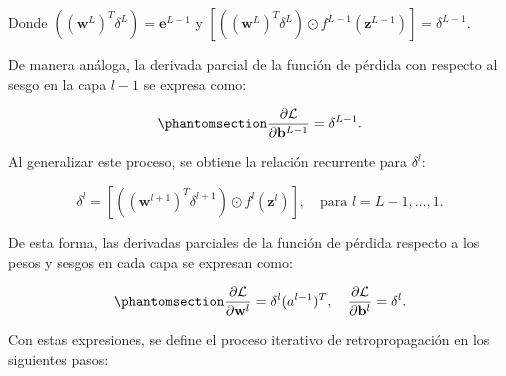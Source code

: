\documentclass[
  us-letterpaper,
]{scrreprt}
\theoremstyle{definition}
\theoremstyle{plain}
\theoremstyle{plain}
\theoremstyle{definition}
\theoremstyle{remark}
\begin{document}
Donde \(((\mathbf w^L)^T \delta^L) = \mathbf e^{L-1}\) y
\([((\mathbf w^L)^T \delta^L)\odot f^{L-1}(\mathbf z^{L-1})] = \delta^{L-1}\).

De manera análoga, la derivada parcial de la función de pérdida con
respecto al sesgo en la capa \(l-1\) se expresa como:

\begin{equation}\phantomsection\label{eq-24}{\frac{\partial \mathcal L}{\partial \mathbf b^{L-1}} = \delta^{L-1}.}\end{equation}

Al generalizar este proceso, se obtiene la relación recurrente para
\(\delta^l\):

\[\delta^l = \left[((\mathbf w^{l+1})^T \delta^{l+1})\odot f^l(\mathbf z^l) \right], \quad \text{para } l = L-1, \ldots, 1.\]

De esta forma, las derivadas parciales de la función de pérdida respecto
a los pesos y sesgos en cada capa se expresan como:

\begin{equation}\phantomsection\label{eq-25}{\frac{\partial \mathcal L}{\partial \mathbf w^l} = \delta^l (a^{l-1})^T,\quad \frac{\partial \mathcal L}{\partial \mathbf b^l} = \delta^l.}\end{equation}

Con estas expresiones, se define el proceso iterativo de
retropropagación en los siguientes pasos:
\end{document}
